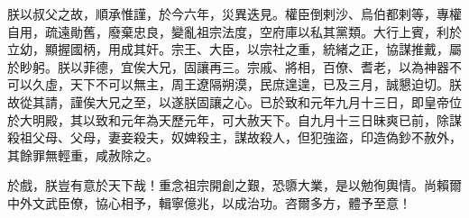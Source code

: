 \begin{pinyinscope}
 朕以叔父之故，順承惟謹，於今六年，災異迭見。權臣倒剌沙、烏伯都剌等，專權自用，疏遠勛舊，廢棄忠良，變亂祖宗法度，空府庫以私其黨類。大行上賓，利於立幼，顯握國柄，用成其奸。宗王、大臣，以宗社之重，統緒之正，協謀推戴，屬於眇躬。朕以菲德，宜俟大兄，固讓再三。宗戚、將相，百僚、耆老，以為神器不可以久虛，天下不可以無主，周王遼隔朔漠，民庶遑遑，已及三月，誠懇迫切。朕故從其請，謹俟大兄之至，以遂朕固讓之心。已於致和元年九月十三日，即皇帝位於大明殿，其以致和元年為天歷元年，可大赦天下。自九月十三日昧爽已前，除謀殺祖父母、父母，妻妾殺夫，奴婢殺主，謀故殺人，但犯強盜，印造偽鈔不赦外，其餘罪無輕重，咸赦除之。



 於戲，朕豈有意於天下哉！重念祖宗開創之艱，恐隳大業，是以勉徇輿情。尚賴爾中外文武臣僚，協心相予，輯寧億兆，以成治功。咨爾多方，體予至意！




\end{pinyinscope}
